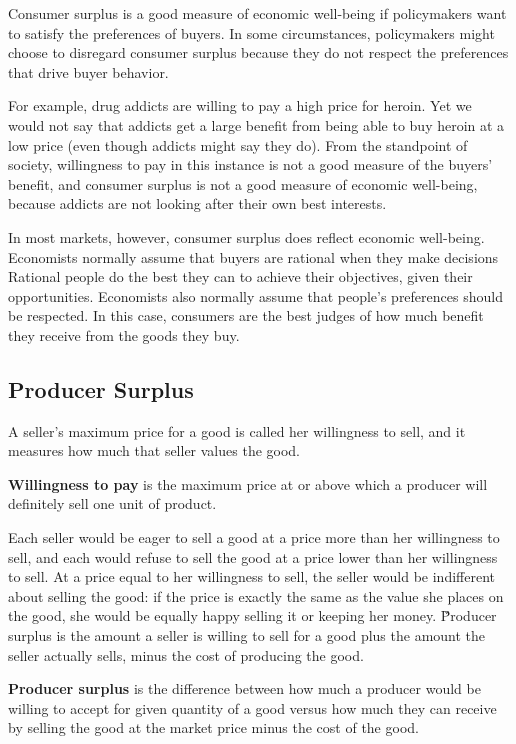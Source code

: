Consumer surplus is a good measure of economic well-being if policymakers want to satisfy the preferences of buyers.
In some circumstances, policymakers might choose to disregard consumer surplus because they do not respect the
preferences that drive buyer behavior.

\be For example, drug addicts are willing to pay a high price for heroin. Yet we would not say that addicts get a
large benefit from being able to buy heroin at a low price (even though addicts might say they do). From the
standpoint of society, willingness to pay in this instance is not a good measure of the buyers' benefit, and consumer
surplus is not a good measure of economic well-being, because addicts are not looking after their own best interests.
\ee

In most markets, however, consumer surplus does reflect economic well-being. Economists normally assume that buyers
are rational when they make decisions Rational people do the best they can to achieve their objectives, given their
opportunities. Economists also normally assume that people's preferences should be respected. In this case, consumers
are the best judges of how much benefit they receive from the goods they buy.

\subsection{Producer Surplus}

A seller's maximum price for a good is called her willingness to sell, and it measures how much that seller values
the good.

\textbf{Willingness to pay} is the maximum price at or above which a producer will definitely sell one unit of product.
\ed

Each seller would be eager to sell a good at a price more than her willingness to sell, and each would refuse to sell
the good at a price lower than her willingness to sell. At a price equal to her willingness to sell, the seller would
be indifferent about selling the good: if the price is exactly the same as the value she places on the good, she
would be equally happy selling it or keeping her money. \v

Producer surplus is the amount a seller is willing to sell for a good plus the amount the seller actually sells,
minus the cost of producing the good.

\textbf{Producer surplus} is the difference between how much a producer would be willing to accept for given quantity
of a good versus how much they can receive by selling the good at the market price minus the cost of the good.
\ed

